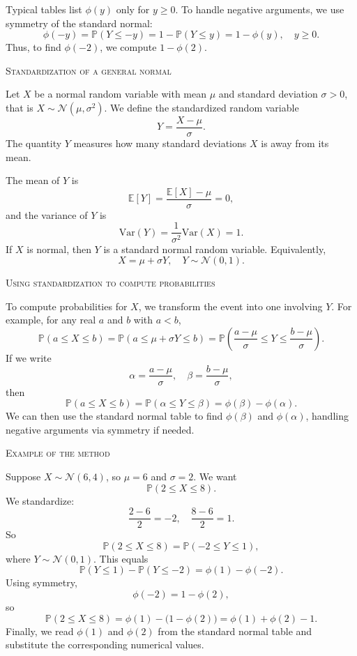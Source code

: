 Typical tables list \(\phi(y)\) only for \(y \ge 0\).  
To handle negative arguments, we use symmetry of the standard normal:
\[
\phi(-y) = \mathbb{P}(Y \le -y) = 1 - \mathbb{P}(Y \le y) = 1 - \phi(y), \quad y \ge 0.
\]
Thus, to find \(\phi(-2)\), we compute \(1 - \phi(2)\).  

\bigskip\textsc{Standardization of a general normal}

Let \(X\) be a normal random variable with mean \(\mu\) and standard deviation \(\sigma > 0\), that is \(X \sim \mathcal{N}(\mu,\sigma^2)\).  
We define the standardized random variable
\[
Y = \frac{X - \mu}{\sigma}.
\]
The quantity \(Y\) measures how many standard deviations \(X\) is away from its mean.  

The mean of \(Y\) is
\[
\mathbb{E}[Y] = \frac{\mathbb{E}[X] - \mu}{\sigma} = 0,
\]
and the variance of \(Y\) is
\[
\mathrm{Var}(Y) = \frac{1}{\sigma^2} \mathrm{Var}(X) = 1.
\]
If \(X\) is normal, then \(Y\) is a standard normal random variable.  
Equivalently,
\[
X = \mu + \sigma Y, \quad Y \sim \mathcal{N}(0,1).
\]

\bigskip\textsc{Using standardization to compute probabilities}

To compute probabilities for \(X\), we transform the event into one involving \(Y\).  
For example, for any real \(a\) and \(b\) with \(a < b\),
\[
\mathbb{P}(a \le X \le b)
= \mathbb{P}\!\left(a \le \mu + \sigma Y \le b\right)
= \mathbb{P}\!\left(\frac{a-\mu}{\sigma} \le Y \le \frac{b-\mu}{\sigma}\right).
\]
If we write
\[
\alpha = \frac{a-\mu}{\sigma}, \quad \beta = \frac{b-\mu}{\sigma},
\]
then
\[
\mathbb{P}(a \le X \le b) = \mathbb{P}(\alpha \le Y \le \beta) = \phi(\beta) - \phi(\alpha).
\]
We can then use the standard normal table to find \(\phi(\beta)\) and \(\phi(\alpha)\), handling negative arguments via symmetry if needed.

\bigskip\textsc{Example of the method}

Suppose \(X \sim \mathcal{N}(6,4)\), so \(\mu = 6\) and \(\sigma = 2\).  
We want
\[
\mathbb{P}(2 \le X \le 8).
\]
We standardize:
\[
\frac{2 - 6}{2} = -2, \quad \frac{8 - 6}{2} = 1.
\]
So
\[
\mathbb{P}(2 \le X \le 8) = \mathbb{P}(-2 \le Y \le 1),
\]
where \(Y \sim \mathcal{N}(0,1)\).  
This equals
\[
\mathbb{P}(Y \le 1) - \mathbb{P}(Y \le -2)
= \phi(1) - \phi(-2).
\]
Using symmetry,
\[
\phi(-2) = 1 - \phi(2),
\]
so
\[
\mathbb{P}(2 \le X \le 8)
= \phi(1) - \big(1 - \phi(2)\big)
= \phi(1) + \phi(2) - 1.
\]
Finally, we read \(\phi(1)\) and \(\phi(2)\) from the standard normal table and substitute the corresponding numerical values.


